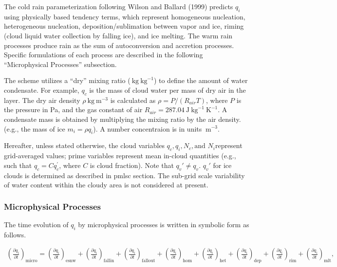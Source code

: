 The cold rain parameterization following Wilson and Ballard (1999)
predicts \(q_i\) using physically based tendency terms, which represent
homogeneous nucleation, heterogeneous nucleation, deposition/sublimation
between vapor and ice, riming (cloud liquid water collection by falling
ice), and ice melting. The warm rain processes produce rain as the sum
of autoconversion and accretion processes. Specific formulations of each
process are described in the following ``Microphysical Processes''
subsection.

The scheme utilizes a ``dry'' mixing ratio
(\(\mathrm{~kg} \mathrm{~kg}^{-1}\)) to define the amount of water
condensate. For example, \(q_c\) is the mass of cloud water per mass of
dry air in the layer. The dry air density
\(\rho \mathrm{~kg} \mathrm{~m}^{-3}\) is calculated as
\(\rho =P/(R_{air}T)\), where \(P\) is the pressure in Pa, and the gas
constant of air
\(R_{air} =287.04 \mathrm{~J} \mathrm{~kg}^{-1} \mathrm{~K}^{-1}\). A
condensate mass is obtained by multiplying the mixing ratio by the air
density. (e.g., the mass of ice \(m_i = \rho q_i\)). A number
concentraion is in units \(\mathrm{~m}^{-3}\).

Hereafter, unless stated otherwise, the cloud variables
\(q_c, q_i,N_c, \text{and } N_i\)represent grid-averaged values; prime
variables represent mean in-cloud quantities (e.g., such that
\(q_c = C q_c^{'}\), where \(C\) is cloud fraction). Note that
\(q_v{'} \neq q_v\). \(q_v{'}\) for ice clouds is determined as
described in pmlsc section. The sub-grid scale variability of water
content within the cloudy area is not considered at present.

\hypertarget{microphysical-processes}{%
\subsubsection{Microphysical Processes}\label{microphysical-processes}}

The time evolution of \(q_i\) by microphysical processes is written in
symbolic form as follows.

\begin{eqnarray}
\left(\frac{\partial q_i}{\partial t}\right)_{\text {micro}}
=\left(\frac{\partial q_i}{\partial t}\right)_{\text {esnw}}
+\left(\frac{\partial q_i}{\partial t}\right)_{\text {fallin}}
+\left(\frac{\partial q_i}{\partial t}\right)_{\text {fallout}}
+\left(\frac{\partial q_i}{\partial t}\right)_{\text {hom}}
+\left(\frac{\partial q_i}{\partial t}\right)_{\text {het}}
+\left(\frac{\partial q_i}{\partial t}\right)_{\text {dep}}
+\left(\frac{\partial q_i}{\partial t}\right)_{\text {rim}}
+\left(\frac{\partial q_i}{\partial t}\right)_{\text {mlt}},
\end{eqnarray}

